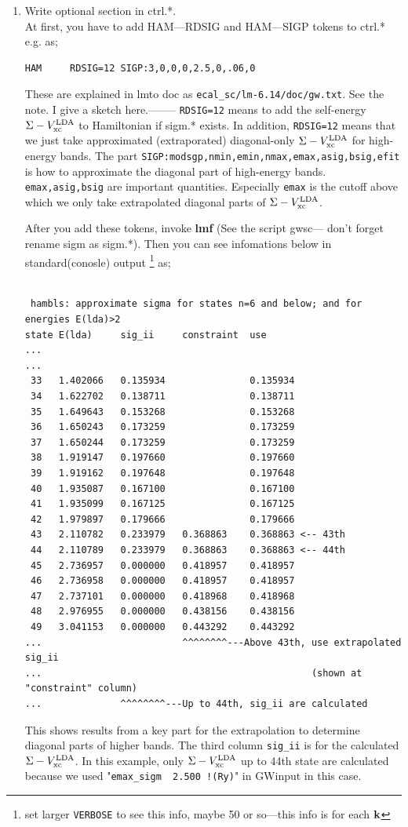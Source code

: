 \documentclass[a4paper,10pt,epsf,fleqn]{article}
\newcommand{\bfk}{{\bf k}}
\newcommand{\exe}[1]{{\bf #1}}
\newcommand{\io}[1]{{\sf  #1}}
\newcommand{\raw}[1]{{\tt #1}}
\begin{document}
{{{\begin{enumerate}
\item Write optional section in \io{ctrl.*}.\\
At first, you have to add HAM---RDSIG and HAM---SIGP tokens to \io{ctrl.*} 
e.g. as;
\begin{verbatim}
HAM     RDSIG=12 SIGP:3,0,0,0,2.5,0,.06,0
\end{verbatim}
These are explained in lmto doc as \verb#ecal_sc/lm-6.14/doc/gw.txt#.
See the note. I give a sketch here.--------
\raw{RDSIG=12} means to add the self-energy $\Sigma -V_{\rm xc}^{\rm LDA}$
to Hamiltonian if \io{sigm.*} exists. In addition, \raw{RDSIG=12}
means that we just take approximated (extraporated) diagonal-only 
$\Sigma -V_{\rm xc}^{\rm LDA}$ for high-energy bands.
The part \verb#SIGP:modsgp,nmin,emin,nmax,emax,asig,bsig,efit# 
is how to approximate the diagonal part of high-energy bands.
\verb#emax,asig,bsig# are important quantities.
Especially \verb#emax# is the cutoff above which we only 
take extrapolated diagonal parts of $\Sigma -V_{\rm xc}^{\rm LDA}$.

After you add these tokens, invoke \exe{lmf} (See the script \io{gwsc}--- don't forget rename \io{sigm} as \io{sigm.*}).
Then you can see infomations below in standard(conosle) output 
\footnote{set larger \raw{VERBOSE} to see this info, maybe 50 or so---this info is for each $\bfk$} as;
{\small \baselineskip=2.5mm
\begin{verbatim}

 hambls: approximate sigma for states n=6 and below; and for energies E(lda)>2
state E(lda)     sig_ii     constraint  use
...
...
 33   1.402066   0.135934               0.135934
 34   1.622702   0.138711               0.138711
 35   1.649643   0.153268               0.153268
 36   1.650243   0.173259               0.173259
 37   1.650244   0.173259               0.173259
 38   1.919147   0.197660               0.197660
 39   1.919162   0.197648               0.197648
 40   1.935087   0.167100               0.167100
 41   1.935099   0.167125               0.167125
 42   1.979897   0.179666               0.179666
 43   2.110782   0.233979   0.368863    0.368863 <-- 43th 
 44   2.110789   0.233979   0.368863    0.368863 <-- 44th 
 45   2.736957   0.000000   0.418957    0.418957
 46   2.736958   0.000000   0.418957    0.418957
 47   2.737101   0.000000   0.418968    0.418968
 48   2.976955   0.000000   0.438156    0.438156
 49   3.041153   0.000000   0.443292    0.443292
...                         ^^^^^^^^---Above 43th, use extrapolated sig_ii 
...                                                (shown at "constraint" column)
...              ^^^^^^^^---Up to 44th, sig_ii are calculated
\end{verbatim}}
This shows results from a key part for the extrapolation 
to determine diagonal parts of higher bands. The third column \verb#sig_ii# is for the calculated
$\Sigma -V_{\rm xc}^{\rm LDA}$.
In this example, only $\Sigma -V_{\rm xc}^{\rm LDA}$ up to 44th state are calculated because we
used "\verb#emax_sigm  2.500 !(Ry)#" in \io{GWinput} in this case.


\end{enumerate}}}}
\end{document}
